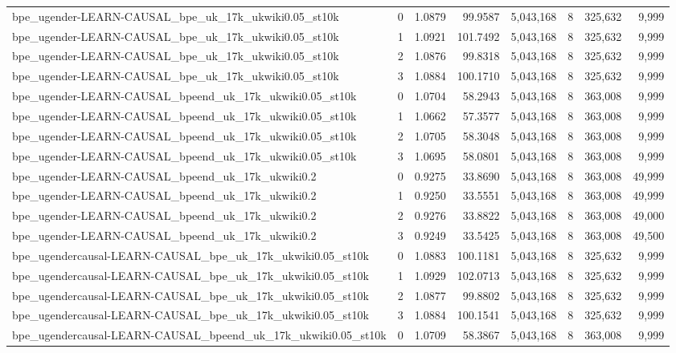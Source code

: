 \begin{tabular}{lrrrrrrr}
bpe\_ugender-LEARN-CAUSAL\_bpe\_uk\_17k\_ukwiki0.05\_st10k & 0 & 1.0879 & 99.9587 & 5,043,168 & 8 & 325,632 & 9,999 \\
bpe\_ugender-LEARN-CAUSAL\_bpe\_uk\_17k\_ukwiki0.05\_st10k & 1 & 1.0921 & 101.7492 & 5,043,168 & 8 & 325,632 & 9,999 \\
bpe\_ugender-LEARN-CAUSAL\_bpe\_uk\_17k\_ukwiki0.05\_st10k & 2 & 1.0876 & 99.8318 & 5,043,168 & 8 & 325,632 & 9,999 \\
bpe\_ugender-LEARN-CAUSAL\_bpe\_uk\_17k\_ukwiki0.05\_st10k & 3 & 1.0884 & 100.1710 & 5,043,168 & 8 & 325,632 & 9,999 \\
bpe\_ugender-LEARN-CAUSAL\_bpeend\_uk\_17k\_ukwiki0.05\_st10k & 0 & 1.0704 & 58.2943 & 5,043,168 & 8 & 363,008 & 9,999 \\
bpe\_ugender-LEARN-CAUSAL\_bpeend\_uk\_17k\_ukwiki0.05\_st10k & 1 & 1.0662 & 57.3577 & 5,043,168 & 8 & 363,008 & 9,999 \\
bpe\_ugender-LEARN-CAUSAL\_bpeend\_uk\_17k\_ukwiki0.05\_st10k & 2 & 1.0705 & 58.3048 & 5,043,168 & 8 & 363,008 & 9,999 \\
bpe\_ugender-LEARN-CAUSAL\_bpeend\_uk\_17k\_ukwiki0.05\_st10k & 3 & 1.0695 & 58.0801 & 5,043,168 & 8 & 363,008 & 9,999 \\
bpe\_ugender-LEARN-CAUSAL\_bpeend\_uk\_17k\_ukwiki0.2 & 0 & 0.9275 & 33.8690 & 5,043,168 & 8 & 363,008 & 49,999 \\
bpe\_ugender-LEARN-CAUSAL\_bpeend\_uk\_17k\_ukwiki0.2 & 1 & 0.9250 & 33.5551 & 5,043,168 & 8 & 363,008 & 49,999 \\
bpe\_ugender-LEARN-CAUSAL\_bpeend\_uk\_17k\_ukwiki0.2 & 2 & 0.9276 & 33.8822 & 5,043,168 & 8 & 363,008 & 49,000 \\
bpe\_ugender-LEARN-CAUSAL\_bpeend\_uk\_17k\_ukwiki0.2 & 3 & 0.9249 & 33.5425 & 5,043,168 & 8 & 363,008 & 49,500 \\
bpe\_ugendercausal-LEARN-CAUSAL\_bpe\_uk\_17k\_ukwiki0.05\_st10k & 0 & 1.0883 & 100.1181 & 5,043,168 & 8 & 325,632 & 9,999 \\
bpe\_ugendercausal-LEARN-CAUSAL\_bpe\_uk\_17k\_ukwiki0.05\_st10k & 1 & 1.0929 & 102.0713 & 5,043,168 & 8 & 325,632 & 9,999 \\
bpe\_ugendercausal-LEARN-CAUSAL\_bpe\_uk\_17k\_ukwiki0.05\_st10k & 2 & 1.0877 & 99.8802 & 5,043,168 & 8 & 325,632 & 9,999 \\
bpe\_ugendercausal-LEARN-CAUSAL\_bpe\_uk\_17k\_ukwiki0.05\_st10k & 3 & 1.0884 & 100.1541 & 5,043,168 & 8 & 325,632 & 9,999 \\
bpe\_ugendercausal-LEARN-CAUSAL\_bpeend\_uk\_17k\_ukwiki0.05\_st10k & 0 & 1.0709 & 58.3867 & 5,043,168 & 8 & 363,008 & 9,999 \\

\end{tabular}
